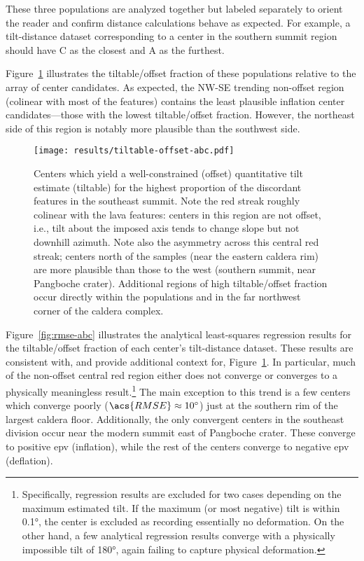 These three populations are analyzed together but labeled separately to orient the reader and confirm distance calculations behave as expected. For example, a tilt-distance dataset corresponding to a center in the southern summit region should have C as the closest and A as the furthest.

Figure~\ref{fig:tiltable-offset-abc} illustrates the tiltable/offset fraction of these populations relative to the array of center candidates. As expected, the NW-SE trending non-offset region (colinear with most of the features) contains the least plausible inflation center candidates---those with the lowest tiltable/offset fraction. However, the northeast side of this region is notably more plausible than the southwest side.

\begin{figure}
    \texttt{[image: results/tiltable-offset-abc.pdf]}%
    \caption[Centers by tiltable/offset fraction]{Centers which yield a well-constrained (offset) quantitative tilt estimate (tiltable) for the highest proportion of the discordant features in the southeast summit. Note the red streak roughly colinear with the lava features: centers in this region are not offset, i.e., tilt about the imposed axis tends to change slope but not downhill azimuth. Note also the asymmetry across this central red streak; centers north of the samples (near the eastern caldera rim) are more plausible than those to the west (southern summit, near Pangboche crater). Additional regions of high tiltable/offset fraction occur directly within the populations and in the far northwest corner of the caldera complex.}%
    \label{fig:tiltable-offset-abc}
\end{figure}

Figure~\ref{fig:rmse-abc} illustrates the analytical least-squares regression results for the tiltable/offset fraction of each center's tilt-distance dataset. These results are consistent with, and provide additional context for, Figure~\ref{fig:tiltable-offset-abc}. In particular, much of the non-offset central red region either does not converge or converges to a physically meaningless result.\footnote{Specifically, regression results are excluded for two cases depending on the maximum estimated tilt. If the maximum (or most negative) tilt is within \ang{0.1}, the center is excluded as recording essentially no deformation. On the other hand, a few analytical regression results converge with a physically impossible tilt of \ang{180}, again failing to capture physical deformation.} The main exception to this trend is a few centers which converge poorly ($\acs{RMSE}\approx\ang{10}$) just at the southern rim of the largest caldera floor. Additionally, the only convergent centers in the southeast division occur near the modern summit east of Pangboche crater. These converge to positive \acs{epv} (inflation), while the rest of the centers converge to negative \acs{epv} (deflation).


